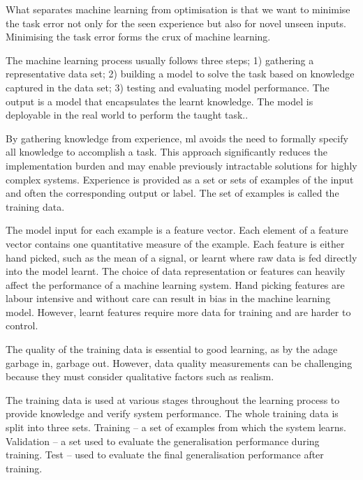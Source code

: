 What separates machine learning from optimisation is that we want to minimise the task error not only for the seen experience but also for novel unseen inputs. Minimising the task error forms the crux of machine learning.\cite{Goodfellow2015}

The machine learning process usually follows three steps; 1) gathering a representative data set; 2) building a model to solve the task based on knowledge captured in the data set; 3) testing and evaluating model performance\cite{Burkov2019}. The output is a model that encapsulates the learnt knowledge. The model is deployable in the real world to perform the taught task.\cite{Shalev-Shwartz2014}.

By gathering knowledge from experience, \acrshort{ml} avoids the need to formally specify all knowledge to accomplish a task\cite{Goodfellow2015}. This approach significantly reduces the implementation burden and may enable previously intractable solutions for highly complex systems. Experience is provided as a set or sets of examples of the input and often the corresponding output or label. The set of examples is called the training data.

The model input for each example is a feature vector. Each element of a feature vector contains one quantitative measure of the example. Each feature is either hand picked, such as the mean of a signal, or learnt where raw data is fed directly into the model learnt. The choice of data representation or features can heavily affect the performance of a machine learning system. Hand picking features are labour intensive and without care can result in bias in the machine learning model. However, learnt features require more data for training and are harder to control.\cite{Bengio2013}

The quality of the training data is essential to good learning, as by the adage garbage in, garbage out. However, data quality measurements can be challenging because they must consider qualitative factors such as realism.

The training data is used at various stages throughout the learning process to provide knowledge and verify system performance. The whole training data is split into three sets. Training – a set of examples from which the system learns. Validation – a set used to evaluate the generalisation performance during training. Test – used to evaluate the final generalisation performance after training.

